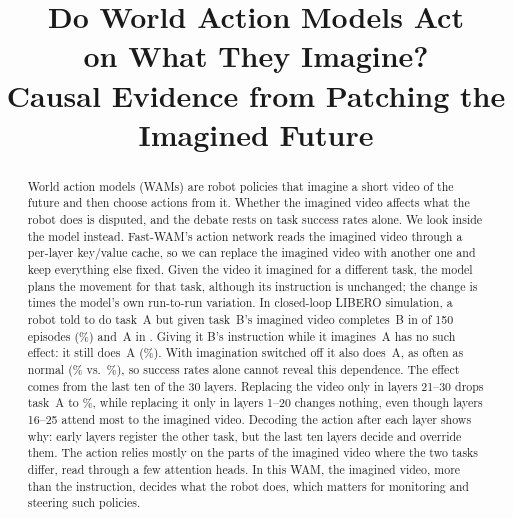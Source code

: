 \documentclass[conference]{IEEEtran}
\begin{document}
\title{Do World Action Models Act\\ on What They Imagine?\\
Causal Evidence from Patching the Imagined Future}

\author{%
}

\maketitle

\begin{abstract}
World action models (WAMs) are robot policies that imagine a short video of the future and then choose actions
from it. Whether the imagined video affects what the robot does is disputed, and the debate rests on task success rates
alone. We look inside the model instead. Fast-WAM's action network reads the imagined video through a per-layer
key/value cache, so we can replace the imagined video with another one and keep everything else fixed. Given the video
it imagined for a different task, the model plans the movement for that task, although its instruction is unchanged;
the change is \nRatioFresh{} times the model's own run-to-run variation. In closed-loop LIBERO simulation, a robot told
to do task~A but given task~B's imagined video completes~B in \nFutBPooled{} of 150 episodes (\nFutBPooledPct\%)
and~A in \nFutAPooled. Giving it B's instruction while it imagines~A has no such effect: it still does~A
(\nTextAPooledPct\%). With imagination switched off it also does~A, as often as normal (\nNoImgAPooledPct\% vs.\
\nCleanAPooledPct\%), so success rates alone cannot reveal this dependence. The effect comes from the last ten of the 30 layers. Replacing the video only in layers 21--30
drops task~A to \nBandLateA\%, while replacing it only in layers 1--20 changes nothing, even though layers 16--25 attend
most to the imagined video. Decoding the action after each layer shows why: early layers register the other task, but
the last ten layers decide and override them. The action relies mostly on the parts of the imagined video where the two
tasks differ, read through a few attention heads. In this WAM, the imagined video, more than the instruction, decides
what the robot does, which matters for monitoring and steering such policies.
\end{abstract}
\end{document}
